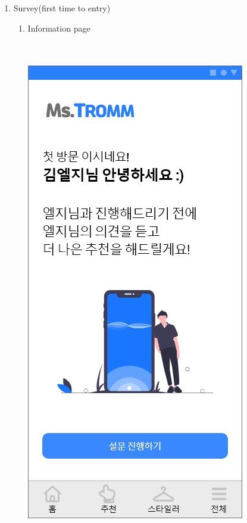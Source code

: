 \documentclass[conference]{IEEEtran}
\begin{document}
\begin{enumerate}
    \item Survey(first time to entry) 
    \begin{enumerate}
    \item Information page \\ \\ \\
    \centerline{\includegraphics[scale=0.32]{설문지1.jpg}}
    \begin{itemize}

\end{itemize}
\end{enumerate}
\end{enumerate}
\end{document}
